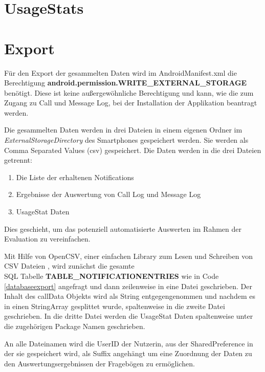 \section{UsageStats}

\section{Export}

Für den Export der gesammelten Daten wird im AndroidManifest.xml die Berechtigung \textbf{android.permission.WRITE\_EXTERNAL\_STORAGE}
benötigt. 
Diese ist keine außergewöhnliche Berechtigung und kann, wie die zum Zugang zu Call und Message Log, bei der Installation der Applikation beantragt werden.
\par
Die gesammelten Daten werden in drei Dateien in einem eigenen Ordner im \emph{ExternalStorageDirectory} des Smartphones gespeichert werden.
Sie werden als Comma Separated Values (csv) gespeichert.
Die Daten werden in die drei Dateien getrennt:

\begin{enumerate}
  \item Die Liste der erhaltenen Notifications
  \item Ergebnisse der Auswertung von Call Log und Message Log
  \item UsageStat Daten
\end{enumerate}

Dies geschieht, um das potenziell automatisierte Auswerten im Rahmen der Evaluation zu vereinfachen.
\par

Mit Hilfe von OpenCSV, einer einfachen Library zum Lesen und Schreiben von CSV Dateien \cite{opencsv},
wird zunächst die gesamte \\SQL Tabelle \textbf{TABLE\_NOTIFICATIONENTRIES} wie in Code \ref{databaseexport} angefragt und dann zeilenweise in eine Datei geschrieben.
Der Inhalt des callData Objekts wird als String entgegengenommen und nachdem es in einen StringArray gesplittet wurde, spaltenweise in die zweite Datei geschrieben.
In die dritte Datei werden die UsageStat Daten spaltenweise unter die zugehörigen Package Namen geschrieben.
\par
An alle Dateinamen wird die UserID der Nutzerin, aus der SharedPreference in der sie gespeichert wird, als Suffix angehängt um eine Zuordnung der Daten zu den Auswertungsergebnissen der Fragebögen zu ermöglichen.


